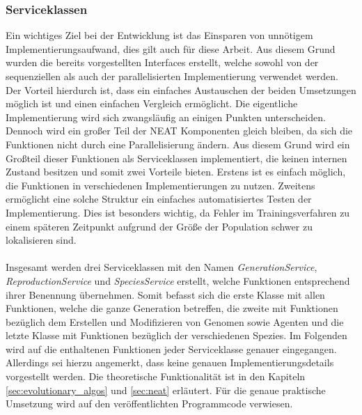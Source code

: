 \subsubsection{Serviceklassen}
Ein wichtiges Ziel bei der Entwicklung ist das Einsparen von unnötigem Implementierungsaufwand, dies gilt auch für diese Arbeit. Aus diesem Grund wurden die bereits vorgestellten Interfaces erstellt, welche sowohl von der sequenziellen als auch der parallelisierten Implementierung verwendet werden. Der Vorteil hierdurch ist, dass ein einfaches Austauschen der beiden Umsetzungen möglich ist und einen einfachen Vergleich ermöglicht. Die eigentliche Implementierung wird sich zwangsläufig an einigen Punkten unterscheiden. Dennoch wird ein großer Teil der \ac{NEAT} Komponenten gleich bleiben, da sich die Funktionen nicht durch eine Parallelisierung ändern. Aus diesem Grund wird ein Großteil dieser Funktionen als Serviceklassen implementiert, die keinen internen Zustand besitzen und somit zwei Vorteile bieten. Erstens ist es einfach möglich, die Funktionen in verschiedenen Implementierungen zu nutzen. Zweitens ermöglicht eine solche Struktur ein einfaches automatisiertes Testen der Implementierung. Dies ist besonders wichtig, da Fehler im Trainingsverfahren zu einem späteren Zeitpunkt aufgrund der Größe der Population schwer zu lokalisieren sind.
\\\\
Insgesamt werden drei Serviceklassen mit den Namen \emph{GenerationService}, \emph{ReproductionService} und \emph{SpeciesService} erstellt, welche Funktionen entsprechend ihrer Benennung übernehmen. Somit befasst sich die erste Klasse mit allen Funktionen, welche die ganze Generation betreffen, die zweite mit Funktionen bezüglich dem Erstellen und Modifizieren von Genomen sowie Agenten und die letzte Klasse mit Funktionen bezüglich der verschiedenen Spezies. Im Folgenden wird auf die enthaltenen Funktionen jeder Serviceklasse genauer eingegangen. Allerdings sei hierzu angemerkt, dass keine genauen Implementierungsdetails vorgestellt werden. Die theoretische Funktionalität ist in den Kapiteln \ref{sec:evolutionary_algos} und  \ref{sec:neat} erläutert. Für die genaue praktische Umsetzung wird auf den veröffentlichten Programmcode verwiesen.
\\\\
